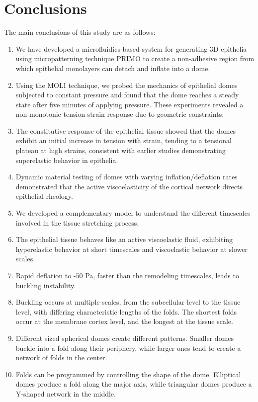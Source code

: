 
\hypertarget{conclusions}{%
	\section{Conclusions}\label{conclusions}}

The main conclusions of this study are as follows:

\begin{enumerate}
	\def\labelenumi{\arabic{enumi}.}
	\item We have developed a microfluidics-based system for generating 3D epithelia using micropatterning technique PRIMO to create a non-adhesive region from which epithelial monolayers can detach and inflate into a dome.
	\item Using the MOLI technique, we probed the mechanics of epithelial domes subjected to constant pressure and found that the dome reaches a steady state after five minutes of applying pressure. These experiments revealed a non-monotonic tension-strain response due to geometric constraints.
	\item The constitutive response of the epithelial tissue showed that the domes exhibit an initial increase in tension with strain, tending to a tensional plateau at high strains, consistent with earlier studies demonstrating superelastic behavior in epithelia.
	\item Dynamic material testing of domes with varying inflation/deflation rates demonstrated that the active viscoelasticity of the cortical network directs epithelial rheology.
	\item We developed a complementary model to understand the different timescales involved in the tissue stretching process.
	\item The epithelial tissue behaves like an active viscoelastic fluid, exhibiting hyperelastic behavior at short timescales and viscoelastic behavior at slower scales.
	\item Rapid deflation to -50 Pa, faster than the remodeling timescales, leads to buckling instability.
	\item Buckling occurs at multiple scales, from the subcellular level to the tissue level, with differing characteristic lengths of the folds. The shortest folds occur at the membrane cortex level, and the longest at the tissue scale.
	\item Different sized spherical domes create different patterns. Smaller domes buckle into a fold along their periphery, while larger ones tend to create a network of folds in the center.
	\item Folds can be programmed by controlling the shape of the dome. Elliptical domes produce a fold along the major axis, while triangular domes produce a Y-shaped network in the middle.
\end{enumerate}

